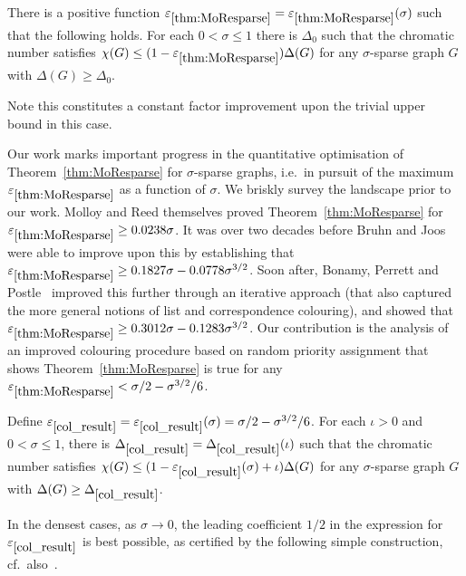\begin{theorem}\label{thm:MoResparse}
There is a positive function $\varepsilon_{\ref{thm:MoResparse}}=\varepsilon_{\ref{thm:MoResparse}}(\sigma)$ such that the following holds.
For each $0<\sigma\le1$ there is $\Delta_0$ such that the chromatic number satisfies $\chi(G)\le (1-\varepsilon_{\ref{thm:MoResparse}})\Delta(G)$ for any $\sigma$-sparse graph $G$ with $\Delta(G)\ge\Delta_0$.
\end{theorem}
\noindent
Note this constitutes a constant factor improvement upon the trivial upper bound in this case.

Our work marks important progress in the quantitative optimisation of Theorem~\ref{thm:MoResparse} for $\sigma$-sparse graphs, i.e.~in pursuit of the maximum $\varepsilon_{\ref{thm:MoResparse}}$ as a function of $\sigma$. We briskly survey the landscape prior to our work. Molloy and Reed themselves proved Theorem~\ref{thm:MoResparse} for 
$\varepsilon_{\ref{thm:MoResparse}} \ge 0.0238\sigma$.
It was over two decades before Bruhn and Joos~\cite{BrJo18} were able to improve upon this by establishing that 
$\varepsilon_{\ref{thm:MoResparse}} \ge 0.1827\sigma-0.0778\sigma^{3/2}$.
Soon after, Bonamy, Perrett and Postle~\cite{BPP18+} improved this further through an iterative approach (that also captured the more general notions of list and correspondence colouring), and showed that  
$\varepsilon_{\ref{thm:MoResparse}} \ge 0.3012\sigma-0.1283\sigma^{3/2}$.
Our contribution is the analysis of an improved colouring procedure based on random priority assignment that shows Theorem~\ref{thm:MoResparse} is true for any 
$\varepsilon_{\ref{thm:MoResparse}} < \sigma/2 - \sigma^{3/2}/6$.
\begin{theorem}
\label{col_result}
Define $\varepsilon_{\ref{col_result}} = \varepsilon_{\ref{col_result}}(\sigma) = \sigma/2 - \sigma^{3/2}/6$.
For each $\iota>0$ and $0<\sigma\le1$, there is $\Delta_{\ref{col_result}}=\Delta_{\ref{col_result}}(\iota)$ such that the chromatic number satisfies $\chi(G)\le (1-\varepsilon_{\ref{col_result}}(\sigma)+\iota)\Delta(G)$ for any $\sigma$-sparse graph $G$ with $\Delta(G)\ge\Delta_{\ref{col_result}}$.
\end{theorem}

\noindent
In the densest cases, as $\sigma\to0$, the leading coefficient $1/2$ in the expression for $\varepsilon_{\ref{col_result}}$ is best possible, as certified by the following simple construction, cf.~also~\cite[Ex.~10.1]{MoRe02}.

